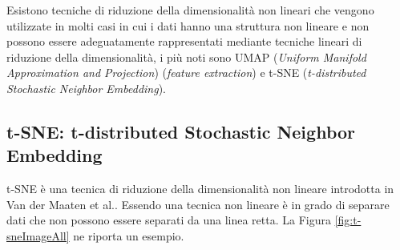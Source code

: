 \documentclass[12pt,italian]{report}
\begin{document}
	Esistono tecniche di riduzione della dimensionalità non lineari che vengono utilizzate in molti casi in cui i dati hanno una struttura non lineare e non possono essere adeguatamente rappresentati mediante tecniche lineari di riduzione della dimensionalità, i più noti sono UMAP (\textit{Uniform Manifold Approximation and Projection}) (\textit{feature extraction}) e t-SNE (\textit{t-distributed Stochastic Neighbor Embedding}).
	\subsection{t-SNE: t-distributed Stochastic Neighbor Embedding}
	\label{t-sne}
	t-SNE è una tecnica di riduzione della dimensionalità non lineare introdotta in Van der Maaten et al.\cite{van2008visualizing}. Essendo una tecnica non lineare è in grado di separare dati che non possono essere separati da una linea retta. La Figura \ref{fig:t-sneImageAll} ne riporta un esempio.
	
\end{document}
